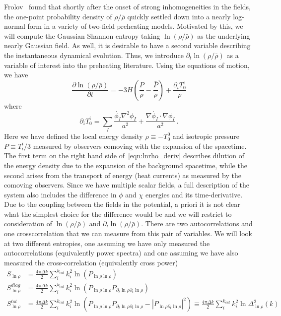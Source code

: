 \documentclass[11pt,a4paper]{article}
\def\lnr{\ln(\rho/\bar{\rho})}
\def\dlnr{\partial_t\ln(\rho/\bar{\rho})}
\begin{document}
Frolov~\cite{Frolov:2008hy} found that shortly after the onset of strong inhomogeneities in the fields, the one-point probability density of $\rho/\bar{\rho}$ quickly settled down into a nearly log-normal form in a variety of two-field preheating models.
Motivated by this, we will compute the Gaussian Shannon entropy taking $\lnr$ as the underlying nearly Gaussian field.
As well, it is desirable to have a second variable describing the instantaneous dynamical evolution.
Thus, we introduce $\dlnr$ as a variable of interest into the preheating literature.
Using the equations of motion, we have
\begin{equation}
  \frac{\partial{\ln(\rho/\bar{\rho})}}{\partial t} = -3H\left(\frac{P}{\rho}-\frac{\bar{P}}{\bar{\rho}}\right) + \frac{\partial_iT^{i}_0}{\rho}
  \label{eqn:lnrho_deriv}
\end{equation}
where
\begin{equation}
  \partial_iT^{i}_0 = \sum_I\frac{\dot{\phi_I}\nabla^2\phi_I}{a^2} + \frac{\nabla\dot{\phi_I}\cdot\nabla\phi_I}{a^2} \, .
  \label{eqn:current_divergence}
\end{equation}
Here we have defined the local energy density $\rho \equiv -T^0_0$ and isotropic pressure $P \equiv T^i_i/3$ measured by observers comoving with the expansion of the spacetime.
The first term on the right hand side of~\eqref{eqn:lnrho_deriv} describes dilution of the energy density due to the expansion of the background spacetime, while the second arises from the transport of energy (heat currents) as measured by the comoving observers.
Since we have multiple scalar fields, a full description of the system also includes the difference in $\phi$ and $\chi$ energies and its time-derivative.
Due to the coupling between the fields in the potential, a priori it is not clear what the simplest choice for the difference would be and we will restrict to consideration of $\lnr$ and $\dlnr$.
There are two autocorrelations and one crosscorrelation that we can measure from this pair of variables.
We will look at two different entropies, one assuming we have only measured the autocorrelations (equivalently power spectra) and one assuming we have also measured the cross-correlation (equivalently cross power)
\begin{align}
  S_{\ln\rho} &= \frac{4\pi\Delta k}{2}\sum_i^{k_{cut}} k_i^2 \ln(P_{\ln\rho\ln\rho}) \\
  S_{\ln\rho}^{diag} &= \frac{4\pi\Delta k}{2}\sum_{i}^{k_{cut}} k_i^2 \ln(P_{\ln\rho\ln\rho}P_{\partial_t\ln\rho\partial_t\ln\rho}) \\
  S^{tot}_{\ln\rho} &= \frac{4\pi\Delta k}{2}\sum_{i}^{k_{cut}} k_i^2 \ln(P_{\ln\rho\ln\rho}P_{\partial_t\ln\rho\partial_t\ln\rho}-|P_{\ln\rho\partial_t\ln\rho}|^2 ) \equiv \frac{4\pi\Delta k}{2}\sum_i^{k_{cut}}k_i^2 \ln\Delta_{\ln\rho}^2(k)
\end{align}
\end{document}
